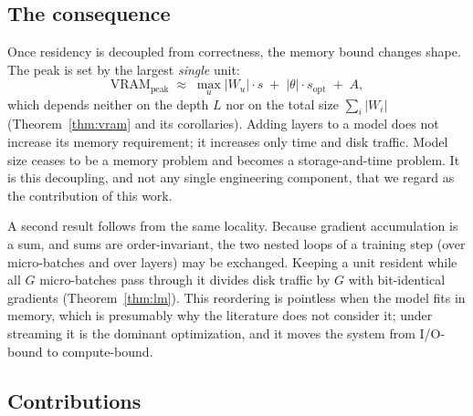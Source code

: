 \documentclass[preprint,12pt]{elsarticle}
\newcommand{\Wu}{\lvert W_u \rvert}
\begin{document}
\subsection{The consequence}

Once residency is decoupled from correctness, the memory bound changes shape. The peak is set by
the largest \emph{single} unit:
\begin{equation}
\label{eq:headline}
\mathrm{VRAM}_{\text{peak}} \;\approx\; \max_u \Wu \cdot s \;+\; |\theta|\cdot s_{\text{opt}} \;+\; A ,
\end{equation}
which depends neither on the depth $L$ nor on the total size $\sum_i |W_i|$
(Theorem~\ref{thm:vram} and its corollaries). Adding layers to a model does not increase its memory
requirement; it increases only time and disk traffic. Model size ceases to be a memory problem and
becomes a storage-and-time problem. It is this decoupling, and not any single engineering
component, that we regard as the contribution of this work.

A second result follows from the same locality. Because gradient accumulation is a sum, and sums
are order-invariant, the two nested loops of a training step (over micro-batches and over
layers) may be exchanged. Keeping a unit resident while all $G$ micro-batches pass through it
divides disk traffic by $G$ with bit-identical gradients (Theorem~\ref{thm:lm}). This reordering is
pointless when the model fits in memory, which is presumably why the literature does not consider
it; under streaming it is the dominant optimization, and it moves the system from I/O-bound to
compute-bound.

\subsection{Contributions}
\end{document}
